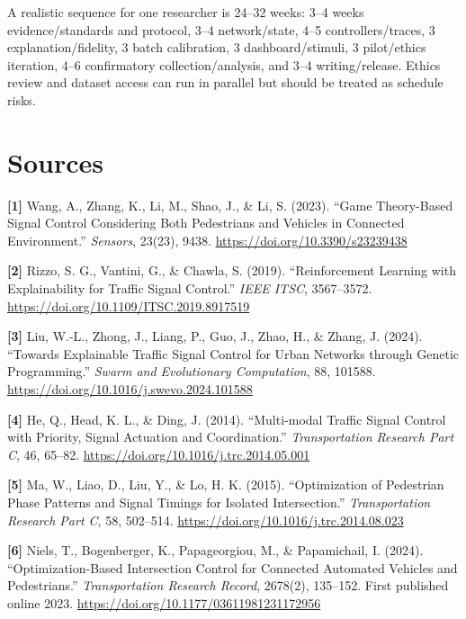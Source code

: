 \documentclass[
  english,
  11pt,
  a4paper,
]{article}
\begin{document}
A realistic sequence for one researcher is 24--32 weeks: 3--4 weeks
evidence/standards and protocol, 3--4 network/state, 4--5
controllers/traces, 3 explanation/fidelity, 3 batch calibration, 3
dashboard/stimuli, 3 pilot/ethics iteration, 4--6 confirmatory
collection/analysis, and 3--4 writing/release. Ethics review and dataset
access can run in parallel but should be treated as schedule risks.

\section{Sources}\label{sources}

\protect{}\label{source-1}{} \textbf{{[}1{]}} Wang, A.,
Zhang, K., Li, M., Shao, J., \& Li, S. (2023). ``Game Theory-Based
Signal Control Considering Both Pedestrians and Vehicles in Connected
Environment.'' \emph{Sensors}, 23(23), 9438.
\url{https://doi.org/10.3390/s23239438}

\protect{}\label{source-2}{} \textbf{{[}2{]}} Rizzo, S. G.,
Vantini, G., \& Chawla, S. (2019). ``Reinforcement Learning with
Explainability for Traffic Signal Control.'' \emph{IEEE ITSC},
3567--3572. \url{https://doi.org/10.1109/ITSC.2019.8917519}

\protect{}\label{source-3}{} \textbf{{[}3{]}} Liu, W.-L.,
Zhong, J., Liang, P., Guo, J., Zhao, H., \& Zhang, J. (2024). ``Towards
Explainable Traffic Signal Control for Urban Networks through Genetic
Programming.'' \emph{Swarm and Evolutionary Computation}, 88, 101588.
\url{https://doi.org/10.1016/j.swevo.2024.101588}

\protect{}\label{source-4}{} \textbf{{[}4{]}} He, Q., Head,
K. L., \& Ding, J. (2014). ``Multi-modal Traffic Signal Control with
Priority, Signal Actuation and Coordination.'' \emph{Transportation
Research Part C}, 46, 65--82.
\url{https://doi.org/10.1016/j.trc.2014.05.001}

\protect{}\label{source-5}{} \textbf{{[}5{]}} Ma, W., Liao,
D., Liu, Y., \& Lo, H. K. (2015). ``Optimization of Pedestrian Phase
Patterns and Signal Timings for Isolated Intersection.''
\emph{Transportation Research Part C}, 58, 502--514.
\url{https://doi.org/10.1016/j.trc.2014.08.023}

\protect{}\label{source-6}{} \textbf{{[}6{]}} Niels, T.,
Bogenberger, K., Papageorgiou, M., \& Papamichail, I. (2024).
``Optimization-Based Intersection Control for Connected Automated
Vehicles and Pedestrians.'' \emph{Transportation Research Record},
2678(2), 135--152. First published online 2023.
\url{https://doi.org/10.1177/03611981231172956}
\end{document}
